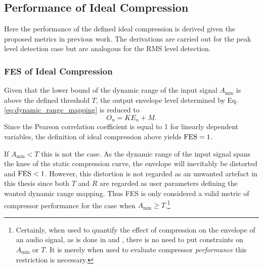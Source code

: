 \documentclass[../main2.tex]{subfiles}
\begin{document}
\subsection{Performance of Ideal Compression}
Here the performance of the defined ideal compression is derived given the proposed metrics in previous work. The derivations are carried out for the peak level detection case but are analogous for the RMS level detection.
\subsubsection{FES of Ideal Compression}
Given that the lower bound of the dynamic range of the input signal $A_\text{min}$ is above the defined threshold $T$, the output envelope level determined by Eq.\eqref{eq:dynamic_range_mapping} is reduced to
\begin{equation}
O_n = K E_n + M.
\end{equation}
Since the Pearson correlation coefficient is equal to 1 for linearly dependent variables, the definition of ideal compression above yields $\text{FES}= 1$.

If $A_\text{min} < T$ this is not the case. As the dynamic range of the input signal spans the knee of the static compression curve, the envelope will inevitably be distorted and $\text{FES}< 1$. However, this distortion is not regarded as an unwanted artefact in this thesis since both $T$ and $R$ are regarded as user parameters defining the wanted dynamic range mapping. Thus FES is only considered a valid metric of compressor performance for the case when $A_\text{min} \geq T$.\footnote{Certainly, when used to quantify the effect of compression on the envelope of an audio signal, as is done in \cite{XXXX} and \cite{XXXX}, there is no need to put constraints on $A_\text{min}$ or $T$. It is merely when used to evaluate compressor \emph{performance} this restriction is necessary.}

\end{document}
